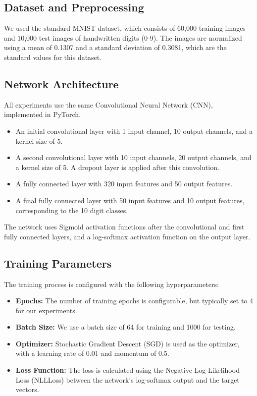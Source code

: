 \documentclass[12pt,fleqn,a4paper]{article}
\begin{document}
 \subsection{Dataset and Preprocessing}
 We used the standard MNIST dataset, which consists of 60,000 training images and 10,000 test images of handwritten digits (0-9). The images are normalized using a mean of 0.1307 and a standard deviation of 0.3081, which are the standard values for this dataset.

 \subsection{Network Architecture}
All experiments use the same Convolutional Neural Network (CNN), implemented in PyTorch.

 \begin{itemize}
     \item An initial convolutional layer with 1 input channel, 10 output channels, and a kernel size of 5.
     \item A second convolutional layer with 10 input channels, 20 output channels, and a kernel size of 5. A dropout layer is applied after this convolution.
     \item A fully connected layer with 320 input features and 50 output features.
     \item A final fully connected layer with 50 input features and 10 output features, corresponding to the 10 digit classes.
 \end{itemize}
 The network uses Sigmoid activation functions after the convolutional and first fully connected layers, and a log-softmax activation function on the output layer.

 \subsection{Training Parameters}
 The training process is configured with the following hyperparameters:
 \begin{itemize}
     \item \textbf{Epochs:} The number of training epochs is configurable, but typically set to 4 for our experiments.
     \item \textbf{Batch Size:} We use a batch size of 64 for training and 1000 for testing.
     \item \textbf{Optimizer:} Stochastic Gradient Descent (SGD) is used as the optimizer, with a learning rate of 0.01 and momentum of 0.5.
     \item \textbf{Loss Function:} The loss is calculated using the Negative Log-Likelihood Loss (NLLLoss) between the network's log-softmax output and the target vectors.
 \end{itemize}
\end{document}
